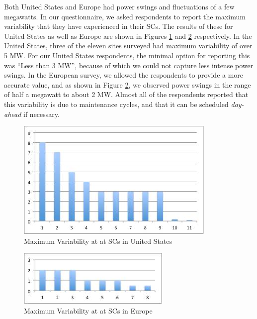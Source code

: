 \documentclass{article}
\begin{document}
Both United States and Europe had power swings and fluctuations of a few megawatts. In our questionnaire, we asked respondents to report the maximum variability that they have experienced in their SCs. The results of these for United States as well as Europe are shown in Figures \ref{fig:USvar} and \ref{fig:EUvar} respectively. In the United States, three of the eleven sites surveyed had maximum variability of over 5 MW. For our United States respondents, the minimal option for reporting this was ``Less than 3 MW'', because of which we could not capture less intense power swings. In the European survey, we allowed the respondents to provide a more accurate value, and as shown in Figure \ref{fig:EUvar}, we observed power swings in the range of half a megawatt to about 2 MW. Almost all of the respondents reported that this variability is due to maintenance cycles, and that it can be scheduled \emph{day-ahead} if necessary.

\begin{figure}
\begin{center}
\includegraphics[scale=0.8]{figs/USVar.jpg}
\caption{Maximum Variability at at SCs in United States}
\label{fig:USvar}
\end{center}
\end{figure}

\begin{figure}
\begin{center}
\includegraphics[scale=0.8]{figs/EUVar.jpg}
\caption{Maximum Variability at at SCs in Europe}
\label{fig:EUvar}
\end{center}
\end{figure}
\end{document}
